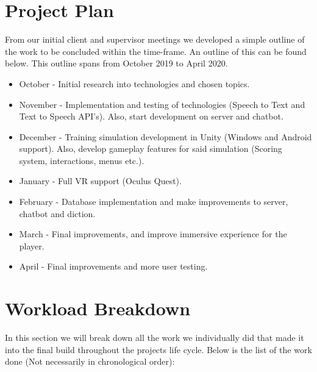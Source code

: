 \section{Project Plan}
From our initial client and supervisor meetings we developed a simple outline of the work to be concluded within the time-frame. An outline of this can be found below. This outline spans from October 2019 to April 2020.

\begin{itemize}
    \item October - Initial research into technologies and chosen topics.
    
    \item November - Implementation and testing of technologies (Speech to Text and Text to Speech API's). Also, start development on server and chatbot.
    
    \item December - Training simulation development in Unity (Windows and Android support). Also, develop gameplay features for said simulation (Scoring system, interactions, menus etc.).
    
    \item January - Full VR support (Oculus Quest). 
    
    \item February - Database implementation and make improvements to server, chatbot and diction.
    
    \item March - Final improvements, and improve immersive experience for the player.
    
    \item April - Final improvements and more user testing.
\end{itemize}

\section{Workload Breakdown}
In this section we will break down all the work we individually did that made it into the final build throughout the projects life cycle. Below is the list of the work done (Not necessarily in chronological order):

